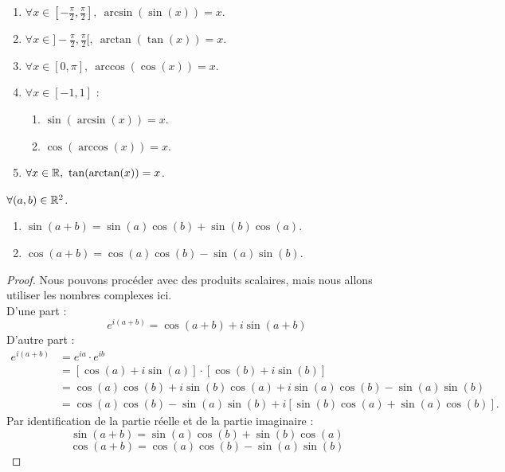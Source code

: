 \begin{proposition}
    \begin{enumerate}
    	\item $\forall x \in [-\frac{\pi}{2}, \frac{\pi}{2}],\ \arcsin(\sin(x)) = x$.
        \item $\forall x \in ]-\frac{\pi}{2}, \frac{\pi}{2}[,\ \arctan(\tan(x)) = x$.
        \item $\forall x \in [0, \pi],\ \arccos(\cos(x)) = x$.
        \item $\forall x \in [-1, 1]$ :
        \begin{enumerate}
                \item $\sin(\arcsin(x)) = x$.
                \item $\cos(\arccos(x)) = x$.
            \end{enumerate}
        \item $\forall x \in \mathbb{R},\ \tan(\arctan(x)) = x$.
    \end{enumerate}
\end{proposition}

\begin{proposition}
	$\forall (a, b) \in \mathbb{R}^2$.
        \begin{enumerate}
            \item $\sin(a + b) = \sin(a) \cos(b) + \sin(b) \cos(a)$.
            \item $\cos(a + b) = \cos(a) \cos(b) - \sin(a) \sin(b)$.
        \end{enumerate}
\end{proposition}

\begin{proof}
    Nous pouvons procéder avec des produits scalaires, mais nous allons utiliser les nombres complexes ici.
    \\
    D'une part :
    \[e^{i (a + b)} = \cos(a + b) + i\sin(a + b)\]
    D'autre part :
    \begin{align*}
        e^{i (a + b)} &= e^{ia} \cdot e^{ib} \\
        &= [\cos(a) + i \sin(a)] \cdot [\cos(b) + i \sin(b)] \\
        &= \cos(a) \cos(b) + i\sin(b)\cos(a) + i\sin(a)\cos(b) - \sin(a)\sin(b) \\
        &= \cos(a)\cos(b) - \sin(a)\sin(b) + i [\sin(b)\cos(a) + \sin(a) \cos(b)].
    \end{align*}
    Par identification de la partie réelle et de la partie imaginaire :
    \[ \sin(a + b) = \sin(a) \cos(b) + \sin(b) \cos(a) \]
	\[ \cos(a + b) = \cos(a) \cos(b) - \sin(a) \sin(b) \]
\end{proof}


